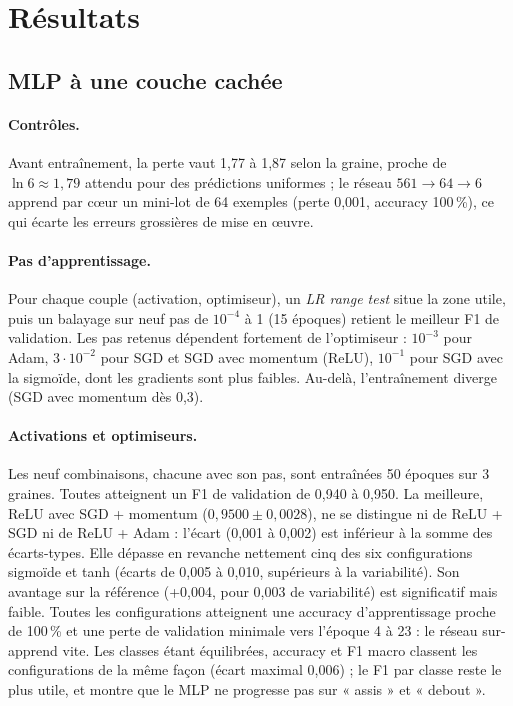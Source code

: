 \documentclass[10pt,a4paper]{article}
\begin{document}
\section{Résultats}
\subsection{MLP à une couche cachée}  %
\paragraph{Contrôles.} Avant entraînement, la perte vaut 1,77 à 1,87 selon la graine, proche de $\ln 6 \approx 1{,}79$
attendu pour des prédictions uniformes ; le réseau $561\to64\to6$ apprend par cœur un mini-lot de 64 exemples
(perte 0,001, accuracy 100\,\%), ce qui écarte les erreurs grossières de mise en œuvre.

\paragraph{Pas d'apprentissage.} Pour chaque couple (activation, optimiseur), un \emph{LR range test} situe la zone
utile, puis un balayage sur neuf pas de $10^{-4}$ à 1 (15 époques) retient le meilleur F1 de validation. Les pas
retenus dépendent fortement de l'optimiseur : $10^{-3}$ pour Adam, $3\cdot10^{-2}$ pour SGD et SGD avec momentum (ReLU),
$10^{-1}$ pour SGD avec la sigmoïde, dont les gradients sont plus faibles. Au-delà, l'entraînement diverge (SGD avec
momentum dès 0,3).

\paragraph{Activations et optimiseurs.} Les neuf combinaisons, chacune avec son pas, sont entraînées 50 époques sur
3 graines. Toutes atteignent un F1 de validation de 0,940 à 0,950. La meilleure, ReLU avec SGD + momentum
($0{,}9500\pm0{,}0028$), ne se distingue ni de ReLU + SGD ni de ReLU + Adam : l'écart (0,001 à 0,002) est inférieur à
la somme des écarts-types. Elle dépasse en revanche nettement cinq des six configurations sigmoïde et tanh (écarts de 0,005 à 0,010, supérieurs
à la variabilité). Son avantage sur la référence (+0,004, pour 0,003 de variabilité) est significatif mais faible. Toutes les configurations atteignent
une accuracy d'apprentissage proche de 100\,\% et une perte de validation minimale vers l'époque 4 à 23 : le réseau
sur-apprend vite. Les classes étant équilibrées, accuracy et F1 macro classent les configurations de la même façon
(écart maximal 0,006) ; le F1 par classe reste le plus utile, et montre que le MLP ne progresse pas sur « assis » et
« debout ».
\end{document}

